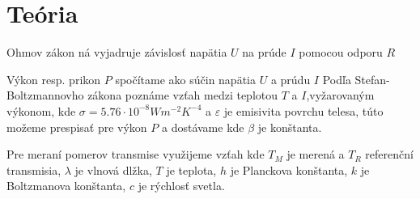 \section{Teória}
Ohmov zákon ná vyjadruje závislosť napätia $U$ na prúde $I$ pomocou odporu $R$

Výkon resp. prikon $P$ spočítame ako súčin napätia $U$ a prúdu $I$ 
Podľa Stefan-Boltzmannovho zákona poznáme vzťah medzi teplotou $T$ a $I$,vyžarovaným výkonom,
kde $\sigma = 5.76\cdot 10^{-8} W m^{-2}K^{-4}$ a $\varepsilon$  je emisivita povrchu telesa, túto možeme prespisať pre výkon $P$ a dostávame
kde $\beta$ je konštanta.

Pre meraní pomerov transmise využijeme vzťah
kde $T_M$ je merená a $T_R$ referenční transmisia, $\lambda$ je vlnová dlžka, $T$ je teplota, $h$ je Planckova konštanta, $k$ je Boltzmanova konštanta, $c$ je rýchlosť svetla.




